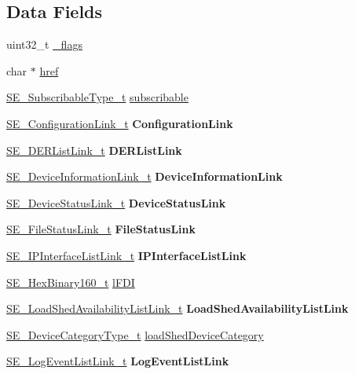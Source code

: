 \subsection*{Data Fields}
\begin{DoxyCompactItemize}
\item 
uint32\+\_\+t \hyperlink{group__EndDevice_ga11e4a5d3538ec472aa2342848487245d}{\+\_\+flags}
\item 
char $\ast$ \hyperlink{group__EndDevice_ga268aeabad7fb9b0e83e5e354dd06f37f}{href}
\item 
\hyperlink{group__SubscribableType_ga5c41f553d369710ed34619266bf2551e}{S\+E\+\_\+\+Subscribable\+Type\+\_\+t} \hyperlink{group__EndDevice_gaa4656eb793a41a2d41ddb4708c236471}{subscribable}
\item 
\hyperlink{structSE__ConfigurationLink__t}{S\+E\+\_\+\+Configuration\+Link\+\_\+t} {\bfseries Configuration\+Link}
\item 
\hyperlink{structSE__DERListLink__t}{S\+E\+\_\+\+D\+E\+R\+List\+Link\+\_\+t} {\bfseries D\+E\+R\+List\+Link}
\item 
\hyperlink{structSE__DeviceInformationLink__t}{S\+E\+\_\+\+Device\+Information\+Link\+\_\+t} {\bfseries Device\+Information\+Link}
\item 
\hyperlink{structSE__DeviceStatusLink__t}{S\+E\+\_\+\+Device\+Status\+Link\+\_\+t} {\bfseries Device\+Status\+Link}
\item 
\hyperlink{structSE__FileStatusLink__t}{S\+E\+\_\+\+File\+Status\+Link\+\_\+t} {\bfseries File\+Status\+Link}
\item 
\hyperlink{structSE__IPInterfaceListLink__t}{S\+E\+\_\+\+I\+P\+Interface\+List\+Link\+\_\+t} {\bfseries I\+P\+Interface\+List\+Link}
\item 
\hyperlink{group__HexBinary160_ga92b92aa55555bdb75f3a59060f2c1632}{S\+E\+\_\+\+Hex\+Binary160\+\_\+t} \hyperlink{group__EndDevice_gafe27205146aef10dbda86b098b9fac01}{l\+F\+DI}
\item 
\hyperlink{structSE__LoadShedAvailabilityListLink__t}{S\+E\+\_\+\+Load\+Shed\+Availability\+List\+Link\+\_\+t} {\bfseries Load\+Shed\+Availability\+List\+Link}
\item 
\hyperlink{group__DeviceCategoryType_gafc136ae19a3dd5b2fd2265d848ddeb2f}{S\+E\+\_\+\+Device\+Category\+Type\+\_\+t} \hyperlink{group__EndDevice_ga3bf79be31f948539ab80cc7b0fc12930}{load\+Shed\+Device\+Category}
\item 
\hyperlink{structSE__LogEventListLink__t}{S\+E\+\_\+\+Log\+Event\+List\+Link\+\_\+t} {\bfseries Log\+Event\+List\+Link}

\end{DoxyCompactItemize}

